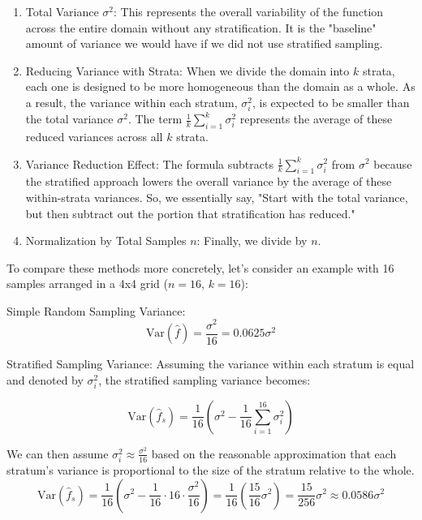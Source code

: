 \documentclass[12pt]{article}
\begin{document}
\begin{enumerate}
    \item Total Variance $\sigma^2$: This represents the overall variability of the function across the entire domain without any stratification. It is the "baseline" amount of variance we would have if we did not use stratified sampling.

    \item Reducing Variance with Strata: When we divide the domain into $k$ strata, each one is designed to be more homogeneous than the domain as a whole. As a result, the variance within each stratum, $\sigma_i^2$, is expected to be smaller than the total variance $\sigma^2$. The term $\frac{1}{k} \sum_{i=1}^k \sigma_i^2$ represents the average of these reduced variances across all $k$ strata.

    \item Variance Reduction Effect: The formula subtracts $\frac{1}{k} \sum_{i=1}^k \sigma_i^2$ from $\sigma^2$ because the stratified approach lowers the overall variance by the average of these within-strata variances. So, we essentially say, "Start with the total variance, but then subtract out the portion that stratification has reduced."

    \item Normalization by Total Samples $n$: Finally, we divide by $n$.
\end{enumerate}

To compare these methods more concretely, let's consider an example with 16 samples arranged in a 4x4 grid ($n = 16$, $k = 16$):

Simple Random Sampling Variance:
\[
    \text{Var}(\hat{f}) = \frac{\sigma^2}{16} = 0.0625\sigma^2
\]

Stratified Sampling Variance: Assuming the variance within each stratum is equal and denoted by $\sigma^2_i$, the stratified sampling variance becomes:

\[
    \text{Var}(\hat{f}_s) = \frac{1}{16} \left( \sigma^2 - \frac{1}{16} \sum_{i=1}^{16} \sigma_i^2 \right)
\]

We can then assume $\sigma_i^2 \approx \frac{\sigma^2}{16}$ based on the reasonable approximation that each stratum's variance is proportional to the size of the stratum relative to the whole.
\[
    \text{Var}(\hat{f}_s)
    = \frac{1}{16} \left( \sigma^2 - \frac{1}{16} \cdot 16 \cdot \frac{\sigma^2}{16} \right)
    = \frac{1}{16} \left( \frac{15}{16} \sigma^2 \right)
    = \frac{15}{256}\sigma^2 \approx 0.0586\sigma^2
\]
\end{document}
